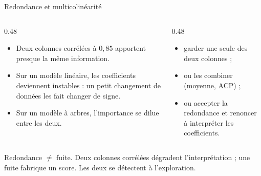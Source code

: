 \begin{frame}{Redondance et multicolinéarité}
\begin{columns}[t]
\begin{column}{0.48\textwidth}
\begin{itemize}
  \item Deux colonnes corrélées à $0{,}85$ apportent presque la même
        information.
  \item Sur un modèle linéaire, les coefficients deviennent instables :
        un petit changement de données les fait changer de signe.
  \item Sur un modèle à arbres, l'importance se dilue entre les deux.
\end{itemize}
\end{column}
\begin{column}{0.48\textwidth}
\begin{kbox}
\begin{itemize}
  \item garder une seule des deux colonnes ;
  \item ou les combiner (moyenne, ACP) ;
  \item ou accepter la redondance et renoncer à interpréter les coefficients.
\end{itemize}
\end{kbox}
\end{column}
\end{columns}
\vspace{1mm}
\begin{wbox}
Redondance $\neq$ fuite. Deux colonnes corrélées dégradent l'interprétation ;
une fuite fabrique un score. Les deux se détectent à l'exploration.
\end{wbox}
\end{frame}

